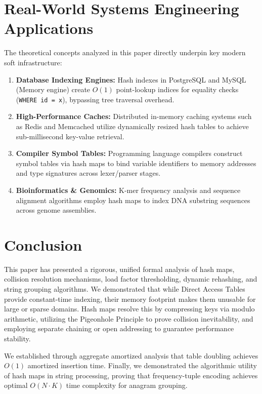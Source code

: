 \documentclass[10pt,journal,compsoc,onecolumn]{IEEEtran}
\begin{document}
\section{Real-World Systems Engineering Applications}
\label{sec:applications}

The theoretical concepts analyzed in this paper directly underpin key modern soft infrastructure:

\begin{enumerate}
    \item \textbf{Database Indexing Engines:} Hash indexes in PostgreSQL and MySQL (Memory engine) create $O(1)$ point-lookup indices for equality checks (\texttt{WHERE id = x}), bypassing tree traversal overhead.
    \item \textbf{High-Performance Caches:} Distributed in-memory caching systems such as Redis and Memcached utilize dynamically resized hash tables to achieve sub-millisecond key-value retrieval.
    \item \textbf{Compiler Symbol Tables:} Programming language compilers construct symbol tables via hash maps to bind variable identifiers to memory addresses and type signatures across lexer/parser stages.
    \item \textbf{Bioinformatics \& Genomics:} K-mer frequency analysis and sequence alignment algorithms employ hash maps to index DNA substring sequences across genome assemblies.
\end{enumerate}

\section{Conclusion}
\label{sec:conclusion}

This paper has presented a rigorous, unified formal analysis of hash maps, collision resolution mechanisms, load factor thresholding, dynamic rehashing, and string grouping algorithms. We demonstrated that while Direct Access Tables provide constant-time indexing, their memory footprint makes them unusable for large or sparse domains. Hash maps resolve this by compressing keys via modulo arithmetic, utilizing the Pigeonhole Principle to prove collision inevitability, and employing separate chaining or open addressing to guarantee performance stability.

We established through aggregate amortized analysis that table doubling achieves $O(1)$ amortized insertion time. Finally, we demonstrated the algorithmic utility of hash maps in string processing, proving that frequency-tuple encoding achieves optimal $O(N \cdot K)$ time complexity for anagram grouping.
\end{document}
